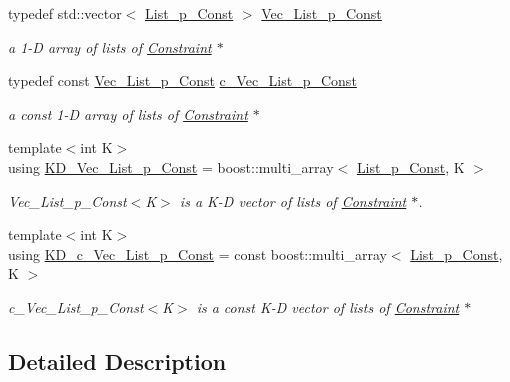 \begin{DoxyCompactItemize}
typedef std\+::vector$<$ \mbox{\hyperlink{group___constraint___t_y_p_e_s_gaa56320d40c626389a8a4ce4b5a4fb0a8}{List\+\_\+p\+\_\+\+Const}} $>$ \mbox{\hyperlink{group___constraint___t_y_p_e_s_gaa409095a6d6a88da1046314c1752d89d}{Vec\+\_\+\+List\+\_\+p\+\_\+\+Const}}
\begin{DoxyCompactList}\small\item\em a 1-\/D array of lists of \mbox{\hyperlink{class_s_m_spp__di__unipi__it_1_1_constraint}{Constraint}} $\ast$ \end{DoxyCompactList}\item 
\mbox{\label{group___constraint___t_y_p_e_s_gad1364b959a8189267f88e2a32a6dd822}} 
typedef const \mbox{\hyperlink{group___constraint___t_y_p_e_s_gaa409095a6d6a88da1046314c1752d89d}{Vec\+\_\+\+List\+\_\+p\+\_\+\+Const}} \mbox{\hyperlink{group___constraint___t_y_p_e_s_gad1364b959a8189267f88e2a32a6dd822}{c\+\_\+\+Vec\+\_\+\+List\+\_\+p\+\_\+\+Const}}
\begin{DoxyCompactList}\small\item\em a const 1-\/D array of lists of \mbox{\hyperlink{class_s_m_spp__di__unipi__it_1_1_constraint}{Constraint}} $\ast$ \end{DoxyCompactList}\item 
\mbox{\label{group___constraint___t_y_p_e_s_ga2f18f39226105e5ccb6059bf22c43c9c}} 
{\footnotesize template$<$int K$>$ }\\using \mbox{\hyperlink{group___constraint___t_y_p_e_s_ga2f18f39226105e5ccb6059bf22c43c9c}{K\+D\+\_\+\+Vec\+\_\+\+List\+\_\+p\+\_\+\+Const}} = boost\+::multi\+\_\+array$<$ \mbox{\hyperlink{group___constraint___t_y_p_e_s_gaa56320d40c626389a8a4ce4b5a4fb0a8}{List\+\_\+p\+\_\+\+Const}}, K $>$
\begin{DoxyCompactList}\small\item\em Vec\+\_\+\+List\+\_\+p\+\_\+\+Const$<$\+K$>$ is a K-\/D vector of lists of \mbox{\hyperlink{class_s_m_spp__di__unipi__it_1_1_constraint}{Constraint}} $\ast$. \end{DoxyCompactList}\item 
\mbox{\label{group___constraint___t_y_p_e_s_gab33537bc99eb8f3e8510dbad57552e6b}} 
{\footnotesize template$<$int K$>$ }\\using \mbox{\hyperlink{group___constraint___t_y_p_e_s_gab33537bc99eb8f3e8510dbad57552e6b}{K\+D\+\_\+c\+\_\+\+Vec\+\_\+\+List\+\_\+p\+\_\+\+Const}} = const boost\+::multi\+\_\+array$<$ \mbox{\hyperlink{group___constraint___t_y_p_e_s_gaa56320d40c626389a8a4ce4b5a4fb0a8}{List\+\_\+p\+\_\+\+Const}}, K $>$
\begin{DoxyCompactList}\small\item\em c\+\_\+\+Vec\+\_\+\+List\+\_\+p\+\_\+\+Const$<$\+K$>$ is a const K-\/D vector of lists of \mbox{\hyperlink{class_s_m_spp__di__unipi__it_1_1_constraint}{Constraint}} $\ast$ \end{DoxyCompactList}\end{DoxyCompactItemize}


\subsection{Detailed Description}
